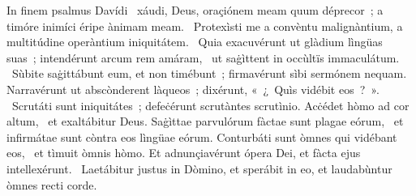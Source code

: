 { In finem psalmus Davídi}
{%
~xáudi, Deus, oraçiónem meam quum déprecor~; a timóre inimíci éripe ànimam meam. 
~Protexìsti me a convèntu malignàntium, a multitúdine operàntium iniquitátem. 
~Quia exacuvérunt ut glàdium lìngüas suas~; intendérunt arcum rem amáram, 
~ut saġìttent in occùltïs immaculátum. 
~Sùbite saġittábunt eum, et non timébunt~; firmavérunt sìbi sermónem nequam. Narravérunt ut abscònderent làqueos~; dixérunt, «~¿~Quìs vidébit eos~?~». 
~Scrutáti sunt iniquitátes~; defeċérunt scrutàntes scrutìnio. Acċédet hòmo ad cor altum, 
~et exaltábitur Deus. Saġìttae parvulórum fàctae sunt plagae eórum, 
~et infirmátae sunt còntra eos lìngüae eórum. Conturbáti sunt òmnes qui vidébant eos, 
~et tìmuit òmnis hòmo. Et adnunçiavérunt ópera Dei, et fàcta ejus intellexérunt. 
~Laetábitur justus in Dòmino, et sperábit in eo, et laudabùntur òmnes recti corde. 
}
